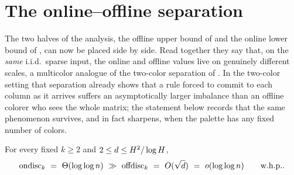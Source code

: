 \section{The online--offline separation}\label{sec:separation}

The two halves of the analysis, the offline upper bound of  and the online lower bound of
, can now be placed side by side. Read together they say that, on the \emph{same} i.i.d.\ sparse input, the
online and offline values live on genuinely different scales, a multicolor analogue of the two-color separation of
\cite{AT2025}. In the two-color setting that separation already shows that a rule forced to commit to each column as it
arrives suffers an asymptotically larger imbalance than an offline colorer who sees the whole matrix; the statement below
records that the same phenomenon survives, and in fact sharpens, when the palette has any fixed number of colors.

\begin{theorem}\label{thm:separation}
For every fixed $k\ge 2$ and $2\le d\le H^2/\log H$,
\[
  \ondisc_k\ =\ \Th(\loglog n)\ \gg\ \offdisc_k\ =\ \Oh(\sqrt d)\ =\ o(\loglog n)\qquad\whp.
\]
\end{theorem}

